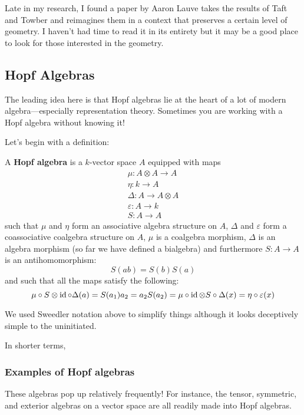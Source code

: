 \documentclass[12pt]{article}
\begin{document}
Late in my research, I found a paper by Aaron Lauve \cite{lauve} takes the results of Taft and Towber and reimagines them in a context that 
preserves a certain level of geometry. I haven't had time to read it in its entirety but it may be a good place to look for those interested in the geometry.

\subsection{Hopf Algebras}
The leading idea here is that Hopf algebras lie at the heart of a lot of modern algebra---especially representation theory. Sometimes you are working with 
a Hopf algebra without knowing it!

Let's begin with a definition:
\begin{defn}
	A \textbf{Hopf algebra} is a $k$-vector space $A$ equipped with maps 
	\begin{gather*}
		\mu:A\otimes A\to A\\
		\eta:k\to A\\
		\Delta:A\to A\otimes A\\
		\varepsilon:A\to k\\
		S:A\to A
	\end{gather*}
	such that $\mu$ and $\eta$ form an associative algebra structure on $A$, $\Delta$ and $\varepsilon$ form a coassociative coalgebra structure on $A$,
	$\mu$ is a coalgebra morphism, $\Delta$ is an algebra morphism (so far we have defined a bialgebra) and furthermore $S:A\to A$ is an antihomomorphism:
	\[S(ab)=S(b)S(a)\]
	and such that all the maps satisfy the following:
	\[\mu\circ S\otimes\operatorname{id}\circ \Delta(a)=S(a_1)a_2=a_2S(a_2)=\mu\circ \operatorname{id}\otimes S\circ\Delta(x)=\eta\circ\varepsilon(x)\]
\end{defn}
\begin{rmk}
	We used Sweedler notation above to simplify things although it looks deceptively simple to the uninitiated.
\end{rmk}
\begin{rmk}
	In shorter terms, 
\end{rmk}

\subsubsection{Examples of Hopf algebras}
These algebras pop up relatively frequently! For instance, the tensor, symmetric, and exterior algebras on a vector space are all 
readily made into Hopf algebras.
\end{document}
